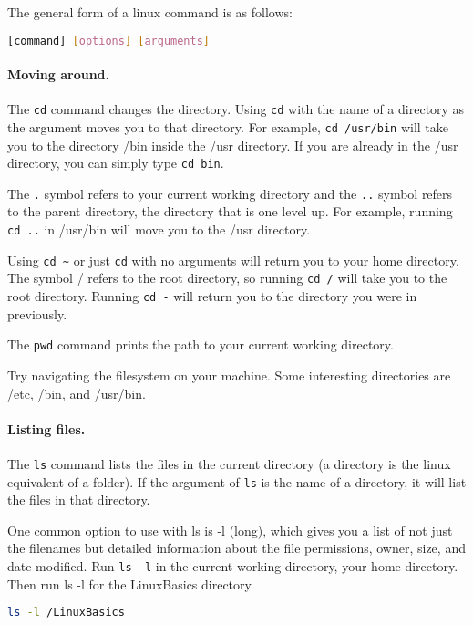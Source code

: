 \documentclass[11pt,a4paper]{article}
\newcommand{\code}[1]{\texttt{#1}\xspace}
\newcommand{\cd}{\code{cd}}
\begin{document}
The general form of a linux command is as follows:

\begin{lstlisting}[basicstyle=\ttfamily, backgroundcolor = \color{lightgray}, language = bash, xleftmargin = 0cm, framexleftmargin = 1em]
[command] [options] [arguments]
\end{lstlisting}

\paragraph{Moving around.}
The \cd command changes the directory. Using \cd with the name of a directory as the argument moves you to that directory. For example, \code{\cd\ /usr/bin} will take you to the directory /bin inside the /usr directory. If you are already in the /usr directory, you can simply type \code{\cd bin}.

The \code{.} symbol refers to your current working directory and the \code{..} symbol refers to the parent directory, the directory that is one level up. For example, running \code{\cd\ ..} in /usr/bin will move you to the /usr directory.

Using \code{\cd\ \textasciitilde} or just \cd with no arguments will return you to your home directory. The symbol / refers to the root directory, so running \code{\cd\ /} will take you to the root directory. Running \code{\cd\ -} will return you to the directory you were in previously.

The \code{pwd} command prints the path to your current working directory.

Try navigating the filesystem on your machine. Some interesting directories are /etc, /bin, and /usr/bin.

\paragraph{Listing files.}
The \code{ls} command lists the files in the current directory (a directory is the linux equivalent of a folder). If the argument of \verb|ls| is the name of a directory, it will list the files in that directory.

One common option to use with ls is -l (long), which gives you a list of not just the filenames but detailed information about the file permissions, owner, size, and date modified. Run \verb|ls -l| in the current working directory, your home directory. Then run ls -l for the LinuxBasics directory.

\begin{lstlisting}[basicstyle=\ttfamily, backgroundcolor = \color{lightgray}, language = bash, xleftmargin = 0cm, framexleftmargin = 1em]
ls -l /LinuxBasics
\end{lstlisting}
\end{document}
